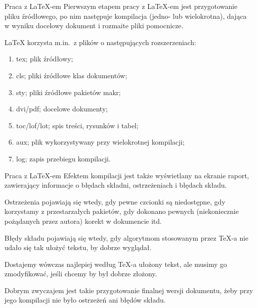 \documentclass[polish,envcountsect,10pt]{beamer}
\begin{document}
\begin{frame}{Praca z {\selectfont\mdseries\LaTeX}-em}
    Pierwszym etapem pracy z {\selectfont\mdseries\LaTeX}-em jest przygotowanie pliku źródłowego, po nim następuje kompilacja (jedno- lub wielokrotna), dająca w wyniku docelowy
    dokument i rozmaite pliki pomocnicze.
    \medskip

    {\selectfont\mdseries\LaTeX} korzysta m.in.\ z plików o następujących rozszerzeniach:
    \begin{enumerate}
        \item tex; plik źródłowy;
        \item cls; pliki źródłowe klas dokumentów;
        \item sty; pliki źródłowe pakietów makr;
        \item dvi/pdf; docelowe dokumenty;
        \item toc/lof/lot; spis treści, rysunków i tabel;
        \item aux; plik wykorzystywany przy wielokrotnej kompilacji;
        \item log; zapis przebiegu kompilacji.
    \end{enumerate}
\end{frame}

\begin{frame}{Praca z {\selectfont\mdseries\LaTeX}-em}
    Efektem kompilacji jest także wyświetlany na ekranie raport, zawierający informacje o błędach składni, ostrzeżeniach i błędach składu.
    \medskip

    Ostrzeżenia pojawiają się wtedy, gdy pewne czcionki są niedostępne, gdy korzystamy z przestarzałych pakietów, gdy dokonano pewnych (niekoniecznie pożądanych przez autora) korekt w dokumencie itd.
    \medskip

    Błędy składu pojawiają się wtedy, gdy algorytmom stosowanym przez {\selectfont\mdseries\TeX}-a nie udało się tak ułożyć tekstu, by dobrze wyglądał.
    \medskip

    Dostajemy wówczas najlepiej według {\selectfont\mdseries\TeX}-a ułożony tekst, ale musimy go zmodyfikować, jeśli chcemy by był dobrze złożony.
    \medskip

    Dobrym zwyczajem jest takie przygotowanie finalnej wersji dokumentu, żeby przy jego kompilacji nie było ostrzeżeń ani błędów składu.
\end{frame}
\end{document}

